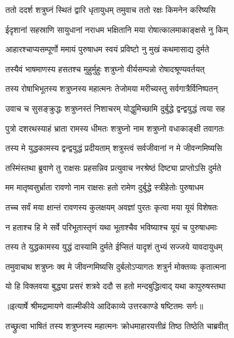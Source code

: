 \twolineshloka
{ततो ददर्श शत्रुघ्नं स्थितं द्वारि धृतायुधम्}
{तमुवाच ततो रक्षः किमनेन करिष्यसि} %

\twolineshloka
{ईदृशानां सहस्राणि सायुधानां नराधम}
{भक्षितानि मया रोषात्कालमाकाङ्क्षसे नु किम्} %

\twolineshloka
{आहारश्चाप्यसम्पूर्णो ममायं पुरुषाधम}
{स्वयं प्रविष्टो नु मुखं कथमासाद्य दुर्मते} %

\twolineshloka
{तस्यैवं भाषमाणस्य हसतश्च मुहुर्मुहुः}
{शत्रुघ्नो वीर्यसम्पन्नो रोषादश्रूण्यवर्तयत्} %

\twolineshloka
{तस्य रोषाभिभूतस्य शत्रुघ्नस्य महात्मनः}
{तेजोमया मरीच्यस्तु सर्वगात्रैर्विनिष्पतन्} %

\twolineshloka
{उवाच च सुसङ्क्रुद्धः शत्रुघ्नस्तं निशाचरम्}
{योद्धुमिच्छामि दुर्बुद्धे द्वन्द्वयुद्धं त्वया सह} %

\twolineshloka
{पुत्रो दशरथस्याहं भ्राता रामस्य धीमतः}
{शत्रुघ्नो नाम शत्रुघ्नो वधाकाङ्क्षी तवागतः} %

\twolineshloka
{तस्य मे युद्धकामस्य द्वन्द्वयुद्धं प्रदीयताम्}
{शत्रुस्त्वं सर्वजीवानां न मे जीवन्गमिष्यसि} %

\twolineshloka
{तस्मिंस्तथा ब्रुवाणे तु राक्षसः प्रहसन्निव}
{प्रत्युवाच नरश्रेष्ठं दिष्ट्या प्राप्तोऽसि दुर्मते} %

\twolineshloka
{मम मातृष्वसुर्भ्राता रावणो नाम राक्षसः}
{हतो रामेण दुर्बुद्धे स्त्रीहेतोः पुरुषाधम} %

\twolineshloka
{तच्च सर्वं मया क्षान्तं रावणस्य कुलक्षयम्}
{अवज्ञां पुरतः कृत्वा मया यूयं विशेषतः} %

\twolineshloka
{न हताश्च हि मे सर्वे परिभूतास्तृणं यथा}
{भूताश्चैव भविष्याश्च यूयं च पुरुषाधमाः} %

\twolineshloka
{तस्य ते युद्धकामस्य युद्धं दास्यामि दुर्मते}
{ईप्सितं यादृशं तुभ्यं सज्जये यावदायुधम्} %

\twolineshloka
{तमुवाचाथ शत्रुघ्नः क्व मे जीवन्गमिष्यसि}
{दुर्बलोऽप्यागतः शत्रुर्न मोक्तव्यः कृतात्मना} %

\twolineshloka
{यो हि विक्लवया बुद्ध्या प्रसरं शत्रवे ददौ}
{स हतो मन्दबुद्धित्वाद् यथा कापुरुषस्तथा} %


{॥इत्यार्षे श्रीमद्रामायणे वाल्मीकीये आदिकाव्ये उत्तरकाण्डे षष्टितमः सर्गः॥}


\twolineshloka
{तच्छ्रुत्वा भाषितं तस्य शत्रुघ्नस्य महात्मनः}
{क्रोधमाहारयत्तीव्रं तिष्ठ तिष्ठेति चाब्रवीत्} %

